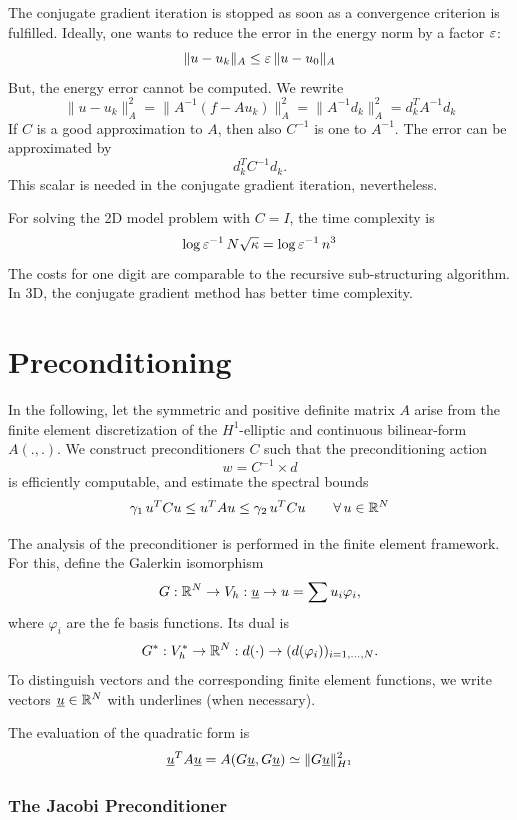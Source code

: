 \bigskip

The conjugate gradient iteration is stopped as soon as a convergence 
criterion is fulfilled. Ideally, one wants to reduce the error in the energy
norm by a factor $\varepsilon$:
$$
\| u - u_k \|_A \leq \varepsilon \, \| u - u_0 \|_A
$$
But, the energy error cannot be computed. We rewrite
$$
\| u - u_k \|_A^2 = \| A^{-1} (f - A u_k) \|_A^2 = \| A^{-1} d_k \|_A^2
= d_k^T A^{-1} d_k
$$
If $C$ is a good approximation to $A$, then also $C^{-1}$ is one to $A^{-1}$. 
The error can be approximated by 
$$
d_k^T C^{-1} d_k.
$$
This scalar is needed in the conjugate gradient iteration, nevertheless.

\bigskip

For solving the 2D model problem with $C = I$, the time complexity is
$$
\log \varepsilon^{-1} \, N \sqrt{\kappa} = \log \varepsilon^{-1} \, n^3
$$
The costs for one digit are comparable to the recursive sub-structuring algorithm. In 3D, the conjugate gradient method has better time complexity. 


\section{Preconditioning}

In the following, let the symmetric and positive definite matrix
$A$ arise from the finite element discretization of the $H^1$-elliptic 
and continuous bilinear-form $A(.,.)$.
We construct preconditioners $C$ such that the preconditioning action
$$
w = C^{-1} \times d
$$
is efficiently computable, and estimate the spectral bounds
$$
\gamma_1 \, u^T C u \leq u^T A u \leq \gamma_2 \, u^T C u \qquad
\forall \, u \in {\mathbb R}^N
$$


The analysis of the preconditioner is performed in the finite element
framework. For this, define the Galerkin isomorphism
$$
G : {\mathbb R}^N \rightarrow V_h : \underline u \rightarrow u = \sum u_i \varphi_i,
$$
where $\varphi_i$ are the fe basis functions. Its dual is 
$$
G^\ast : V_h^\ast \rightarrow {\mathbb R}^N : d(\cdot) \rightarrow (d(\varphi_i))_{i=1,\ldots, N}.
$$
To distinguish vectors and the  corresponding finite element functions,
we write vectors $\underline u \in {\mathbb R}^N$ with underlines (when necessary).

The evaluation of the quadratic form is
$$
\underline u^T A \underline u = A(G \underline u, G \underline u) \simeq \| G \underline u \|_{H^1}^2
$$

\subsubsection{The Jacobi Preconditioner}

